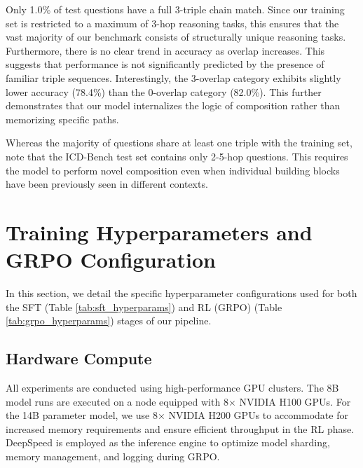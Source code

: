 \documentclass{article}
\theoremstyle{plain}
\theoremstyle{definition}
\theoremstyle{remark}
\begin{document}
Only 1.0\% of test questions have a full 3-triple chain match. Since our training set is restricted to a maximum of 3-hop reasoning tasks, this ensures that the vast majority of our benchmark consists of structurally unique reasoning tasks. Furthermore, there is no clear trend in accuracy as overlap increases. This suggests that performance is not significantly predicted by the presence of familiar triple sequences. Interestingly, the 3-overlap category exhibits slightly lower accuracy (78.4\%) than the 0-overlap category (82.0\%). This further demonstrates that our model internalizes the logic of composition rather than memorizing specific paths.

Whereas the majority of questions share at least one triple with the training set, note that the ICD-Bench test set contains only 2-5-hop questions. This requires the model to perform novel composition even when individual building blocks have been previously seen in different contexts.


\newpage
\section{Training Hyperparameters and GRPO Configuration}
\label{Appendix E}
In this section, we detail the specific hyperparameter configurations used for both the SFT (Table \ref{tab:sft_hyperparams}) and RL (GRPO) (Table \ref{tab:grpo_hyperparams}) stages of our pipeline.

\subsection{Hardware Compute}
All experiments are conducted using high-performance GPU clusters. The 8B model runs are executed on a node equipped with 8$\times$ NVIDIA H100 GPUs. For the 14B parameter model, we use 8$\times$ NVIDIA H200 GPUs to accommodate for increased memory requirements and ensure efficient throughput in the RL phase. DeepSpeed is employed as the inference engine to optimize model sharding, memory management, and logging during GRPO.
\end{document}
